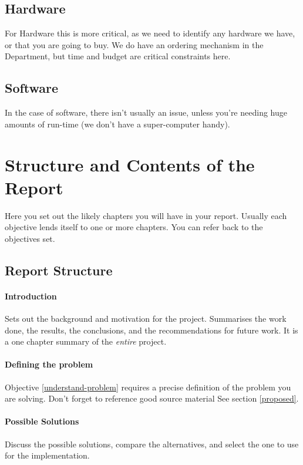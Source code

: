 \subsection{Hardware}
For Hardware this is more critical, as we need to identify any hardware we have, or that you are going to buy.  We do have an ordering mechanism in the Department, but time and budget are critical constraints here.

\subsection{Software}
In the case of software, there isn't usually an issue, unless you're needing huge amounts of run-time (we don't have a super-computer handy).

\section{Structure and Contents of the Report}
Here you set out the likely chapters you will have in your report.  Usually each objective lends itself to one or more chapters.  You can refer back to the objectives set.
\subsection{Report Structure}

\paragraph{Introduction}  Sets out the background and motivation for the project.  Summarises the work done, the results, the conclusions, and the recommendations for future work.  It is a one chapter summary of the \emph{entire} project.

\paragraph{Defining the problem}  Objective \ref{understand-problem} requires a precise definition of the problem you are solving.  Don't forget to reference good source material  See section \ref{proposed}.

\paragraph{Possible Solutions} Discuss the possible solutions, compare the
alternatives, and select the one to use for the  implementation.

